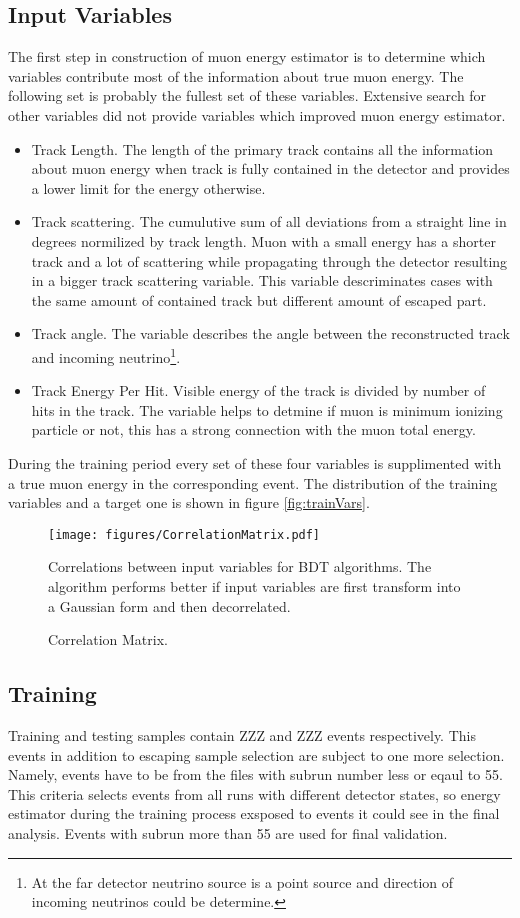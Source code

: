 \subsection{Input Variables}
The first step in construction of muon energy estimator is to determine which variables 
contribute most of the information about true muon energy. The following set is probably
the fullest set of these variables. Extensive search for other variables did not provide 
variables which improved muon energy estimator.
\begin{itemize}
\item Track Length. The length of the primary track contains all the information about muon
energy when track is fully contained in the detector and provides a lower limit for the 
energy otherwise.
\item Track scattering. The cumulutive sum of all deviations from a straight line in degrees
normilized by track length. Muon with a small energy has a shorter track and a lot of scattering 
while propagating through the detector resulting in a bigger track scattering variable. 
This variable descriminates cases with the same amount of contained track but different amount
of escaped part.
\item Track angle. The variable describes the angle between the reconstructed track and 
incoming neutrino\footnote{At the far detector neutrino source is a point source and direction
of incoming neutrinos could be determine.}. 
\item Track Energy Per Hit. Visible energy of the track is divided by number of hits in the 
track. The variable helps to detmine if muon is minimum ionizing particle or not, this has
a strong connection with the muon total energy.
\end{itemize}

During the training period every set of these four variables is supplimented with a true muon
energy in the corresponding event. The distribution of the training variables and a target 
one is shown in figure \ref{fig:trainVars}. 
\begin{figure}[!th]
\centering
\texttt{[image: figures/CorrelationMatrix.pdf]}
\caption{Correlation Matrix.}
{Correlations between input variables for BDT algorithms. The algorithm performs better if input
variables are first transform into a Gaussian form and then decorrelated. }
\label{fig:corrMatrix}
\end{figure}

\subsection{Training}
Training and testing samples contain ZZZ and ZZZ events respectively. This events in addition
to escaping sample selection are subject to one more selection. Namely, events have to be
from the files with subrun number less or eqaul to 55. This criteria selects events from all
runs with different detector states, so energy estimator during the training process exsposed
to events it could see in the final analysis. Events with subrun more than 55 are used for 
final validation. 

